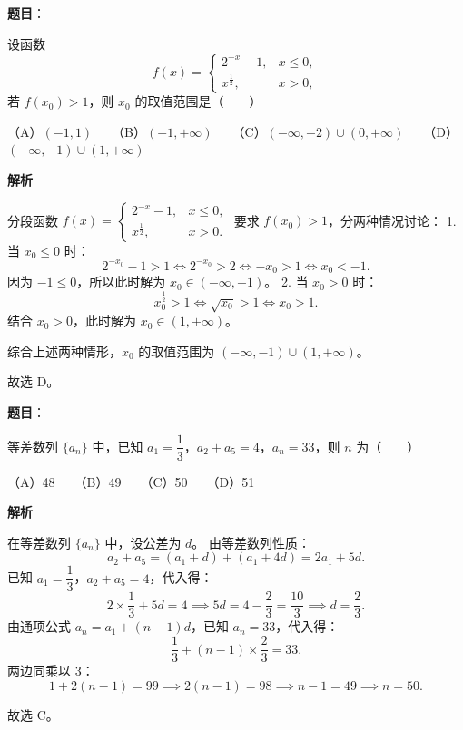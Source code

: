 \begin{answer}

\textbf{题目}：

设函数
\nopagebreak[4]
\[f(x) = \begin{cases} 2^{-x} - 1, & x \le 0, \\ x^{\frac{1}{2}}, & x > 0, \end{cases}\]
若 $f(x_0) > 1$，则 $x_0$ 的取值范围是\mbox{（　　）}

（A）$(-1, 1)$　　（B）$(-1, +\infty)$　　（C）$(-\infty, -2) \cup (0, +\infty)$　　（D）$(-\infty, -1) \cup (1, +\infty)$

\textbf{解析}

分段函数 $f(x) = \begin{cases} 2^{-x} - 1, & x \le 0, \\ x^{\frac{1}{2}}, & x > 0. \end{cases}$
要求 $f(x_0) > 1$，分两种情况讨论：
1. 当 $x_0 \le 0$ 时：
\nopagebreak[4]
\[2^{-x_0} - 1 > 1 \iff 2^{-x_0} > 2 \iff -x_0 > 1 \iff x_0 < -1.\]
   因为 $-1 \le 0$，所以此时解为 $x_0 \in (-\infty, -1)$。
2. 当 $x_0 > 0$ 时：
\nopagebreak[4]
\[x_0^{\frac{1}{2}} > 1 \iff \sqrt{x_0} > 1 \iff x_0 > 1.\]
   结合 $x_0 > 0$，此时解为 $x_0 \in (1, +\infty)$。

综合上述两种情形，$x_0$ 的取值范围为 $(-\infty, -1) \cup (1, +\infty)$。

故选 D。


\end{answer}
\begin{answer}

\textbf{题目}：

等差数列 $\{a_n\}$ 中，已知 $a_1 = \dfrac{1}{3}$，$a_2 + a_5 = 4$，$a_n = 33$，则 $n$ 为\mbox{（　　）}

（A）48　　（B）49　　（C）50　　（D）51

\textbf{解析}

在等差数列 $\{a_n\}$ 中，设公差为 $d$。
由等差数列性质：
\nopagebreak[4]
\[a_2 + a_5 = (a_1 + d) + (a_1 + 4d) = 2a_1 + 5d.\]
已知 $a_1 = \dfrac{1}{3}$，$a_2 + a_5 = 4$，代入得：
\nopagebreak[4]
\[2 \times \frac{1}{3} + 5d = 4 \implies 5d = 4 - \frac{2}{3} = \frac{10}{3} \implies d = \frac{2}{3}.\]
由通项公式 $a_n = a_1 + (n - 1)d$，已知 $a_n = 33$，代入得：
\nopagebreak[4]
\[\frac{1}{3} + (n - 1) \times \frac{2}{3} = 33.\]
两边同乘以 3：
\nopagebreak[4]
\[1 + 2(n - 1) = 99 \implies 2(n - 1) = 98 \implies n - 1 = 49 \implies n = 50.\]

故选 C。


\end{answer}

